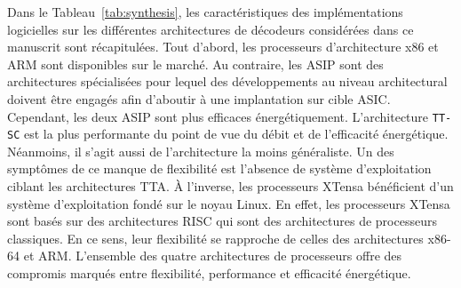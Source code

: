 Dans le Tableau~\ref{tab:synthesis}, les caractéristiques des implémentations logicielles sur les différentes architectures de décodeurs considérées dans ce manuscrit sont récapitulées. Tout d'abord, les processeurs d'architecture x86 et ARM sont disponibles sur le marché. Au contraire, les ASIP sont des architectures spécialisées pour lequel des développements au niveau architectural doivent être engagés afin d'aboutir à une implantation sur cible ASIC. Cependant, les deux ASIP sont plus efficaces énergétiquement. L'architecture \texttt{TT-SC} est la plus performante du point de vue du débit et de l'efficacité énergétique. Néanmoins, il s'agit aussi de l'architecture la moins généraliste. Un des symptômes de ce manque de flexibilité est l'absence de système d'exploitation ciblant les architectures TTA. \`A l'inverse, les processeurs XTensa bénéficient d'un système d'exploitation fondé sur le noyau Linux. En effet, les processeurs XTensa sont basés sur des architectures RISC qui sont des architectures de processeurs classiques. En ce sens, leur flexibilité se rapproche de celles des architectures x86-64 et ARM.
L'ensemble des quatre architectures de processeurs offre des compromis marqués entre flexibilité, performance et efficacité énergétique.

\begin{table}[htp]
\centering
\caption{Existence, disponibilité d'un système d'exploitation, débits et consommations énergétiques des processeurs pour les différentes architectures considérées. Les intervalles de débits et de consommations énergétiques concernent le décodage de mots de codes polaires dont les tailles varient de $N=128$ à $N=1024$ et dont le rendement est $R=1/2$}
\label{tab:synthesis}
{\small{}}
\end{table}

